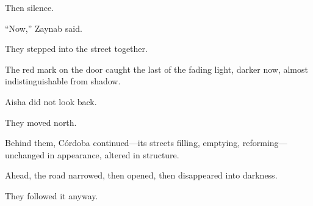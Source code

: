 Then silence.

``Now,'' Zaynab said.

They stepped into the street together.

The red mark on the door caught the last of the fading light, darker now, almost
indistinguishable from shadow.

Aisha did not look back.

They moved north.

Behind them, Córdoba continued---its streets filling, emptying, reforming---unchanged
in appearance, altered in structure.

Ahead, the road narrowed, then opened, then disappeared into darkness.

They followed it anyway.
